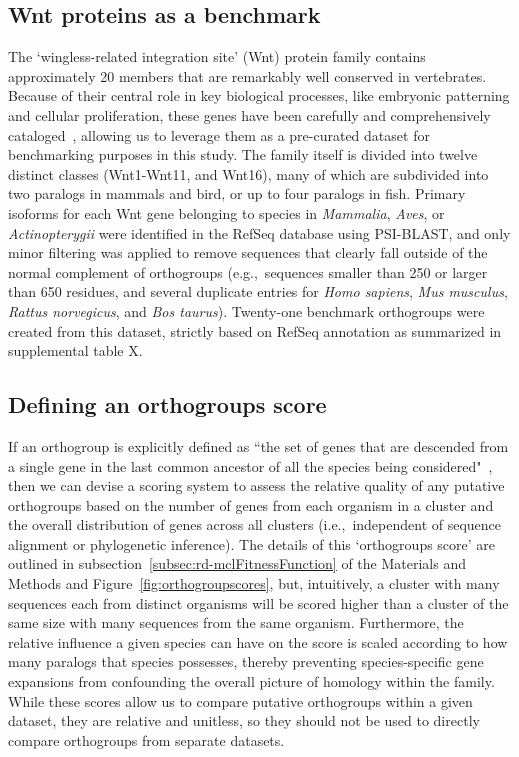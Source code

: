 \documentclass[twocolumn]{bmcart}  %
\begin{document}
\subsection{Wnt proteins as a benchmark}\label{subsec:benchmarkDatasetWnts}
The `wingless-related integration site' (Wnt) protein family contains approximately 20 members that are remarkably well conserved in vertebrates.
Because of their central role in key biological processes, like embryonic patterning and cellular proliferation, these genes have been carefully and comprehensively cataloged~\cite{Garriock:2007hb}, allowing us to leverage them as a pre-curated dataset for benchmarking purposes in this study.
The family itself is divided into twelve distinct classes (Wnt1-Wnt11, and Wnt16), many of which are subdivided into two paralogs in mammals and bird, or up to four paralogs in fish.
Primary isoforms for each Wnt gene belonging to species in \textit{Mammalia}, \textit{Aves}, or \textit{Actinopterygii} were identified in the RefSeq database using PSI-BLAST, and only minor filtering was applied to remove sequences that clearly fall outside of the normal complement of orthogroups (e.g.,\ sequences smaller than 250 or larger than 650 residues, and several duplicate entries for \textit{Homo sapiens}, \textit{Mus musculus}, \textit{Rattus norvegicus}, and \textit{Bos taurus}).
Twenty-one benchmark orthogroups were created from this dataset, strictly based on RefSeq annotation as summarized in supplemental table X\@.

\subsection{Defining an orthogroups score}\label{subsec:definingAnOrthogroupScore}
If an orthogroup is explicitly defined as ``the set of genes that are descended from a single gene in the last common ancestor of all the species being considered"~\cite{Emms:2015ig}, then we can devise a scoring system to assess the relative quality of any putative orthogroups based on the number of genes from each organism in a cluster and the overall distribution of genes across all clusters (i.e.,\ independent of sequence alignment or phylogenetic inference).
The details of this `orthogroups score' are outlined in subsection~\ref{subsec:rd-mclFitnessFunction} of the Materials and Methods and Figure~\ref{fig:orthogroupscores}, but, intuitively, a cluster with many sequences each from distinct organisms will be scored higher than a cluster of the same size with many sequences from the same organism.
Furthermore, the relative influence a given species can have on the score is scaled according to how many paralogs that species possesses, thereby preventing species-specific gene expansions from confounding the overall picture of homology within the family.
While these scores allow us to compare putative orthogroups within a given dataset, they are relative and unitless, so they should not be used to directly compare orthogroups from separate datasets.
\end{document}
